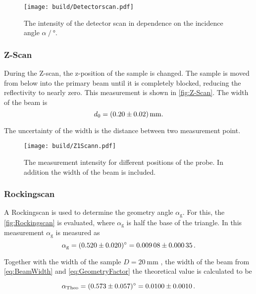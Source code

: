 \begin{figure}[H]
    \centering
    \texttt{[image: build/Detectorscan.pdf]}
    \caption{The intensity of the detector scan in dependence on the incidence angle $\alpha \mathbin{/} \unit{\degree}$.}
    \label{fig:Detectorscan}
\end{figure}

\subsubsection{Z-Scan}

During the Z-scan, the z-position of the sample is changed. 
The sample is moved from below into the primary beam until it is completely blocked, reducing the reflectivity to nearly zero.
This measurement is shown in \autoref{fig:Z-Scan}.
The width of the beam is 
\begin{equation*}
    d_0 = \SI{0.20 \pm 0.02}{\milli\meter}.
    \label{eq:BeamWidth}
\end{equation*}

The uncertainty of the width is the distance between two measurement point.

\begin{figure}[H]
    \centering
    \texttt{[image: build/Z1Scann.pdf]}
    \caption{The measurement intensity for different positions of the probe. In addition the width of the beam is included.} 
    \label{fig:Z-Scan}
\end{figure}



\subsubsection{Rockingscan}

A Rockingscan is used to determine the geometry angle $\alpha_\text{g}$. 
For this, the \autoref{fig:Rockingscan} is evaluated, where $\alpha_\text{g}$ is half the base of the triangle.
In this measurement $\alpha_\text{g}$ is measured as 
\begin{equation*}
    \alpha_\text{g} = \SI{0.520 \pm 0.020}{\degree} = \num{0.00908 \pm 0.00035}\,.
\end{equation*}

Together with the width of the sample $D = \SI{20}{\milli\meter}$ \cite{v44}, the width of the beam from \autoref{eq:BeamWidth} and \autoref{eq:GeometryFactor} the theoretical value is calculated to be 

\begin{equation*}
    \alpha_\text{Theo}  = \SI{0.573 \pm 0.057}{\degree} = \num{0.0100 \pm 0.0010}\,.
\end{equation*}




